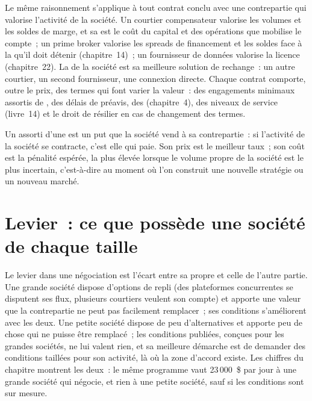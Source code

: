 Le même raisonnement s'applique à tout contrat conclu avec une contrepartie qui valorise l'activité de la société. Un courtier compensateur valorise les volumes et
les soldes de marge, et sa  est le coût du capital et des opérations que mobilise le compte~; un prime broker valorise les spreads de financement et
les soldes face à la  qu'il doit détenir (chapitre~14)~; un fournisseur de données valorise la licence (chapitre~22). La  de la société est
sa meilleure solution de rechange~: un autre courtier, un second fournisseur, une connexion directe. Chaque contrat comporte, outre le prix, des termes qui font varier la valeur~: des engagements minimaux
assortis de , des délais de préavis, des  (chapitre~4), des niveaux de service (livre~14) et le droit de
résilier en cas de changement des termes.

\begin{remark}\label{rem:fm:commercial-relationships-with-venues-brokers-and-vendors:commit}
Un  assorti d'une  est un put que la société vend à sa contrepartie~: si l'activité de la société se contracte, c'est elle qui paie. Son prix est le
meilleur taux~; son coût est la pénalité espérée, la plus élevée lorsque le volume propre de la société est le plus incertain, c'est-à-dire au moment où l'on construit
une nouvelle stratégie ou un nouveau marché.
\end{remark}

\section{Levier~: ce que possède une société de chaque taille}

Le levier dans une négociation est l'écart entre sa propre  et celle de l'autre partie. Une grande société dispose d'options de repli (des plateformes concurrentes se disputent
ses flux, plusieurs courtiers veulent son compte) et apporte une valeur que la contrepartie ne peut pas facilement remplacer~; ses conditions s'améliorent avec les deux. Une petite société
dispose de peu d'alternatives et apporte peu de chose qui ne puisse être remplacé~; les conditions publiées, conçues pour les grandes sociétés, ne lui valent rien, et sa meilleure
démarche est de demander des conditions taillées pour son activité, là où la zone d'accord existe. Les chiffres du chapitre montrent les deux~: le même programme
vaut 23\,000~\$ par jour à une grande société qui négocie, et rien à une petite société, sauf si les conditions sont sur mesure.

